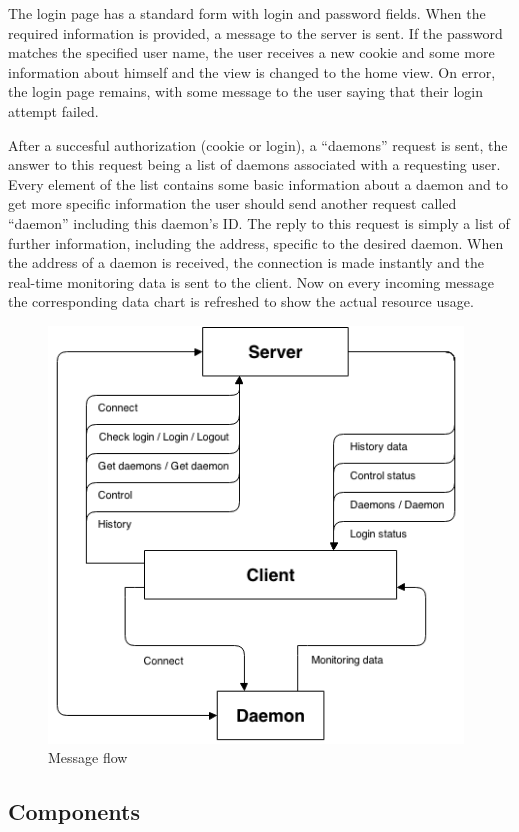 \documentclass{l3proj}
\begin{document}
The login page has a standard form with login and password fields. When the required information is provided, a message to the server is sent. If the password matches the specified user name, the user receives a new cookie and some more information about himself and the view is changed to the home view. On error, the login page remains, with some message to the user saying that their login attempt failed.

After a succesful authorization (cookie or login), a ``daemons'' request is sent, the answer to this request being a list of daemons associated with a requesting user. Every element of the list contains some basic information about a daemon and to get more specific information the user should send another request called ``daemon'' including this daemon's ID. The reply to this request is simply a list of further information, including the address, specific to the desired daemon. When the address of a daemon is received, the connection is made instantly and the real-time monitoring data is sent to the client. Now on every incoming message the corresponding data chart is refreshed to show the actual resource usage.

\begin{figure}[H]
\centering
\includegraphics[width=110mm]{images/messages.png}
\caption{Message flow}
\end{figure}

\subsection{Components}
\end{document}
